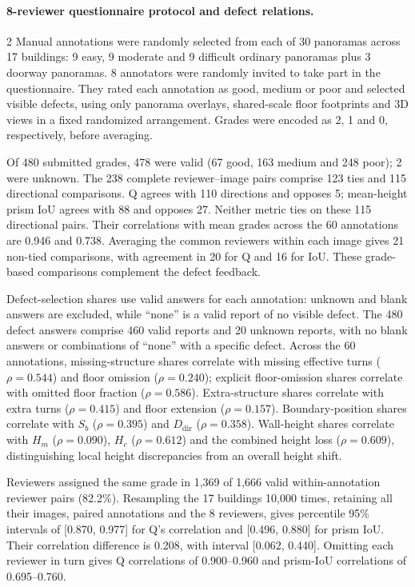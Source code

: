 

\paragraph{8-reviewer questionnaire protocol and defect relations.}
2 Manual annotations were randomly selected from each of 30 panoramas across 17 buildings: 9 easy, 9 moderate and 9 difficult ordinary panoramas plus 3 doorway panoramas. 8 annotators were randomly invited to take part in the questionnaire. They rated each annotation as good, medium or poor and selected visible defects, using only panorama overlays, shared-scale floor footprints and 3D views in a fixed randomized arrangement. Grades were encoded as 2, 1 and 0, respectively, before averaging.

Of 480 submitted grades, 478 were valid (67 good, 163 medium and 248 poor); 2 were unknown. The 238 complete reviewer--image pairs comprise 123 ties and 115 directional comparisons. Q agrees with 110 directions and opposes 5; mean-height prism IoU agrees with 88 and opposes 27. Neither metric ties on these 115 directional pairs. Their correlations with mean grades across the 60 annotations are 0.946 and 0.738. Averaging the common reviewers within each image gives 21 non-tied comparisons, with agreement in 20 for Q and 16 for IoU. These grade-based comparisons complement the defect feedback.

Defect-selection shares use valid answers for each annotation: unknown and blank answers are excluded, while ``none'' is a valid report of no visible defect. The 480 defect answers comprise 460 valid reports and 20 unknown reports, with no blank answers or combinations of ``none'' with a specific defect. Across the 60 annotations, missing-structure shares correlate with missing effective turns (\(\rho=0.544\)) and floor omission (\(\rho=0.240\)); explicit floor-omission shares correlate with omitted floor fraction (\(\rho=0.586\)). Extra-structure shares correlate with extra turns (\(\rho=0.415\)) and floor extension (\(\rho=0.157\)). Boundary-position shares correlate with \(S_b\) (\(\rho=0.395\)) and \(D_{\mathrm{dir}}\) (\(\rho=0.358\)). Wall-height shares correlate with \(H_m\) (\(\rho=0.090\)), \(H_c\) (\(\rho=0.612\)) and the combined height loss (\(\rho=0.609\)), distinguishing local height discrepancies from an overall height shift.

Reviewers assigned the same grade in 1,369 of 1,666 valid within-annotation reviewer pairs (82.2\%). Resampling the 17 buildings 10,000 times, retaining all their images, paired annotations and the 8 reviewers, gives percentile 95\% intervals of [0.870, 0.977] for Q's correlation and [0.496, 0.880] for prism IoU. Their correlation difference is 0.208, with interval [0.062, 0.440]. Omitting each reviewer in turn gives Q correlations of 0.900--0.960 and prism-IoU correlations of 0.695--0.760.

